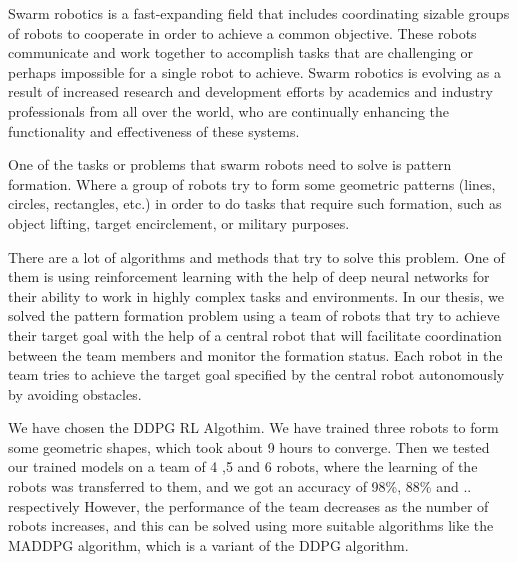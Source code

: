 \documentclass[12pt]{extarticle}
\begin{document}
\pagebreak




Swarm robotics is a fast-expanding field that includes coordinating sizable groups of robots to cooperate in order to achieve a common objective. These robots communicate and work together to accomplish tasks that are challenging or perhaps impossible for a single robot to achieve. Swarm robotics is evolving as a result of increased research and development efforts by academics and industry professionals from all over the world, who are continually enhancing the functionality and effectiveness of these systems.



One of the tasks or problems that swarm robots need to solve is pattern formation. Where a group of robots try to form some geometric patterns (lines, circles, rectangles, etc.) in order to do tasks that require such formation, such as object lifting, target encirclement, or military purposes.

There are a lot of algorithms and methods that try to solve this problem. One of them is using reinforcement learning with the help of deep neural networks for their ability to work in highly complex tasks and environments.
In our thesis, we solved the pattern formation problem using a team of robots that try to achieve their target goal with the help of a central robot that will facilitate coordination between the team members and monitor the formation status. Each robot in the team tries to achieve the target goal specified by the central robot autonomously by avoiding obstacles.


We have chosen the DDPG RL Algothim. We have trained three robots to form some geometric shapes, which took about 9 hours to converge.
Then we tested our trained models on a team of 4 ,5  and 6 robots, where the learning of the robots was transferred to them, and we got an accuracy of 98\%, 88\% and .. respectively
However, the performance of the team decreases as the number of robots increases, and this can be solved using more suitable algorithms like the MADDPG algorithm, which is a variant of the DDPG algorithm.







\newpage


\end{document}

